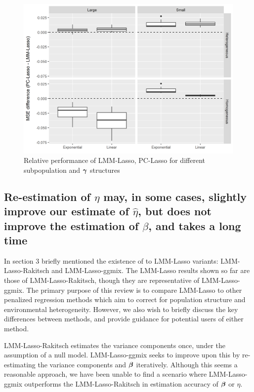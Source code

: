 \begin{figure}[H]
    \centering
    \includegraphics[scale = 0.9]{figures/fig2b.png}
    \caption{Relative performance of LMM-Lasso, PC-Lasso for different subpopulation and $\boldsymbol{\gamma}$ structures}
    \label{fig:big_small_gamma}
\end{figure}

\subsection{Re-estimation of $\eta$ may, in some cases, slightly improve our estimate of $\hat{\eta}$, but does not improve the estimation of $\beta$, and takes a long time}

In section 3 briefly mentioned the existence of to LMM-Lasso variants: LMM-Lasso-Rakitsch and LMM-Lasso-ggmix. The LMM-Lasso results shown so far are those of LMM-Lasso-Rakitsch, though they are representative of LMM-Lasso-ggmix. The primary purpose of this review is to compare LMM-Lasso to other penalized regression methods which aim to correct for population structure and environmental heterogeneity. However, we also wish to briefly discuss the key differences between methods, and provide guidance for potential users of either method. 

LMM-Lasso-Rakitsch estimates the variance components once, under the assumption of a null model. LMM-Lasso-ggmix seeks to improve upon this by re-estimating the variance components and $\boldsymbol{\beta}$ iteratively. Although this seems a reasonable approach, we have been unable to find a scenario where LMM-Lasso-ggmix outperforms the LMM-Lasso-Rakitsch in estimation accuracy of $\boldsymbol{\beta}$ or $\eta$. 


